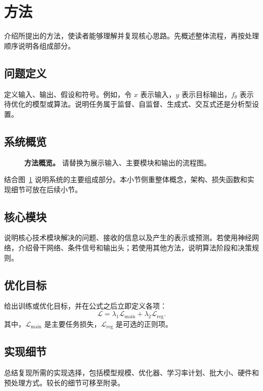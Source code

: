 \section{方法}

介绍所提出的方法，使读者能够理解并复现核心思路。先概述整体流程，再按处理顺序说明各组成部分。

\subsection{问题定义}

定义输入、输出、假设和符号。例如，令 $x$ 表示输入，$y$ 表示目标输出，$f_\theta$ 表示待优化的模型或算法。说明任务属于监督、自监督、生成式、交互式还是分析型设置。

\subsection{系统概览}

\begin{figure}[t]
  \centering
  \caption{\textbf{方法概览。} 请替换为展示输入、主要模块和输出的流程图。}
  \label{fig:method_overview}
\end{figure}

结合图~\ref{fig:method_overview} 说明系统的主要组成部分。本小节侧重整体概念，架构、损失函数和实现细节可放在后续小节。

\subsection{核心模块}

说明核心技术模块解决的问题、接收的信息以及产生的表示或预测。若使用神经网络，介绍骨干网络、条件信号和输出头；若使用其他方法，说明算法阶段和决策规则。

\subsection{优化目标}

给出训练或优化目标，并在公式之后立即定义各项：
\begin{equation}
  \mathcal{L} = \lambda_1 \mathcal{L}_{\mathrm{main}} + \lambda_2 \mathcal{L}_{\mathrm{reg}}.
\end{equation}
其中，$\mathcal{L}_{\mathrm{main}}$ 是主要任务损失，$\mathcal{L}_{\mathrm{reg}}$ 是可选的正则项。

\subsection{实现细节}

总结复现所需的实现选择，包括模型规模、优化器、学习率计划、批大小、硬件和预处理方式。较长的细节可移至附录。
